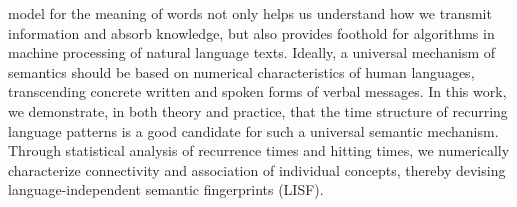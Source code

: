 \documentclass[10pt,journal,compsoc]{IEEEtran}
\begin{document}
%
\IEEEpeerreviewmaketitle







%
%
%
%
 model for the meaning of words not only helps us understand how we transmit information and absorb knowledge, but also provides foothold for algorithms in machine processing of natural language texts. Ideally,  a universal mechanism of semantics should be based  on numerical characteristics of human languages,  transcending concrete written and spoken forms of verbal messages.        In this work, we  demonstrate,  in both theory and practice,  that the time structure  of recurring language patterns is a good candidate for such a universal  semantic mechanism. Through  statistical analysis of   recurrence times and hitting times, we numerically characterize   connectivity and association of individual concepts, thereby devising language-independent semantic fingerprints (LISF).
\end{document}

